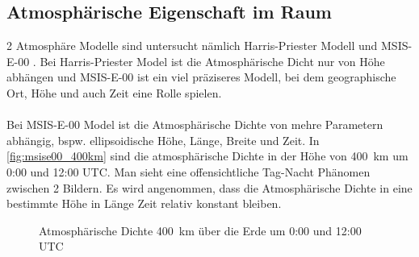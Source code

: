 \documentclass{article}
\begin{document}
\subsection{Atmosphärische Eigenschaft im Raum}
2 Atmosphäre Modelle sind untersucht nämlich Harris-Priester Modell \citep{harris1963relation} und MSIS-E-00 \citep{picone2002nrlmsise}. Bei Harris-Priester Model ist die Atmosphärische Dicht nur von Höhe abhängen und MSIS-E-00 ist ein viel präziseres Modell, bei dem geographische Ort, Höhe und auch Zeit eine Rolle spielen.
\\\\
Bei MSIS-E-00 Model ist die Atmosphärische Dichte von mehre Parametern abhängig, bspw. ellipsoidische Höhe, Länge, Breite und Zeit. In \autoref{fig:msise00_400km} sind die atmosphärische Dichte in der Höhe von \SI{400}{\kilo \meter} um 0:00 und 12:00 UTC. Man sieht eine offensichtliche Tag-Nacht Phänomen zwischen 2 Bildern. Es wird angenommen, dass die Atmosphärische Dichte in eine bestimmte Höhe in Länge Zeit relativ konstant bleiben.
\begin{figure}[ht]\centering 
	\caption{Atmosphärische Dichte \SI{400}{\kilo \meter} über die Erde um 0:00 und 12:00 UTC}
	\label{fig:msise00_400km}
\end{figure}
\end{document}
